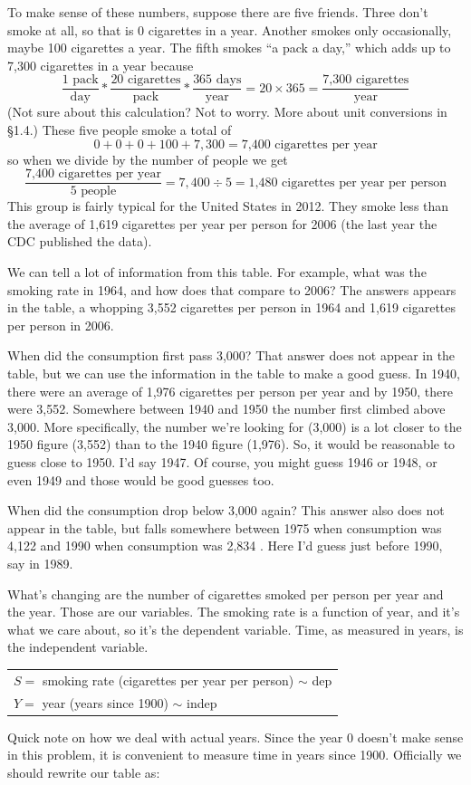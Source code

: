 To make sense of these numbers, suppose there are five friends.  Three don't smoke at all, so that is 0 cigarettes in a year.  Another smokes only occasionally, maybe 100 cigarettes a year.  The fifth smokes ``a pack a day,''  which adds up to 7,300 cigarettes in a year because
$$\frac{1\text{ pack}}{\text{day}} \ast \frac{20\text{ cigarettes}}{\text{pack}} 
\ast \frac{365 \text{ days}}{\text{year}} 
=20 \times 365
= \frac{\text{7,300 cigarettes}}{\text{year}} $$
(Not sure about this calculation?  Not to worry.  More about unit conversions in \S1.4.) %
These five people smoke a total of $$0+0+0+100+7,300=\text{7,400 cigarettes per year}$$
so when we divide by the number of people we get
$$\frac{\text{7,400 cigarettes per year}}{5 \text{ people}} = 7,400 \div 5 = \text{1,480 cigarettes per year per person}$$
This group is fairly typical for the United States in 2012.  They smoke less than the average of 1,619 cigarettes per year per person for 2006 (the last year the CDC published the data). 

We can tell a lot of information from this table.  For example, what was the smoking rate in 1964, and how does that compare to 2006?  The answers appears in the table, a whopping 3,552 cigarettes per person in 1964 and 1,619 cigarettes per person in 2006.

When did the consumption first pass 3,000?  That answer does not appear in the table, but we can use the information in the table to make a good guess.  In 1940, there were an average of 1,976 cigarettes per person per year and by 1950, there were 3,552.  Somewhere between 1940 and 1950 the number first climbed above 3,000.  More specifically, the number we're looking for (3,000) is a lot closer to the 1950 figure (3,552) than to the 1940 figure (1,976).  So, it would be reasonable to guess close to 1950.  I'd say 1947.  Of course, you might guess 1946 or 1948, or even 1949 and those would be good guesses too.  

When did the consumption drop below 3,000 again?  This answer also does not appear in the table, but falls somewhere between 1975 when consumption was 4,122 and 1990 when consumption was  2,834 .  Here I'd guess just before 1990, say in 1989.   

What's changing are the number of cigarettes smoked per person per year and the year.  Those are our variables.  The smoking rate is a function of year, and it's what we care about, so it's the dependent variable.  Time, as measured in years, is the independent variable.   
\begin{center}
\begin{tabular} {l}
$S=$ smoking rate (cigarettes per year per person) $\sim$ dep \\
$Y= $ year (years since 1900) $\sim$ indep \\ 
\end{tabular}
\end{center}
Quick note on how we deal with actual years.  Since the year 0 doesn't make sense in this problem, it is convenient to measure time in years since 1900. Officially we should rewrite our table as:

